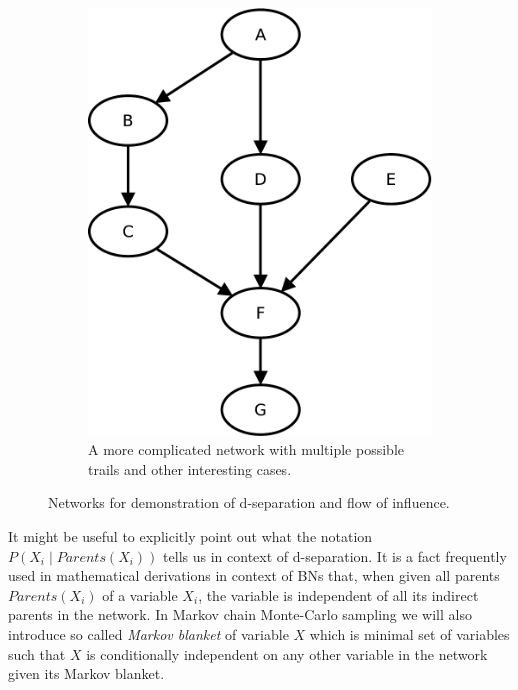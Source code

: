 \documentclass[english,cover]{fitthesis} %
\newcommand{\term}[1]{\emph{#1}}           %
\begin{document}
\begin{center}
\begin{figure}[h]
    \begin{subfigure}[b]{0.42\linewidth}
        \vspace{0.5cm}
        \includegraphics[scale=0.4]{fig/bn-d_sep-abstract}
        \caption{A more complicated network with multiple possible trails and other interesting cases.}
        \label{fig:bn_d-separation_abstract}
    \end{subfigure}
    
    \caption{Networks for demonstration of d-separation and flow of influence.}
    \label{fig:bn_d-separation}
\end{figure}
\end{center}

It might be useful to explicitly point out what the notation $P(X_i \mid Parents(X_i))$ tells us in context of d-separation. It is a fact frequently used in mathematical derivations in context of BNs that, when given all parents $Parents(X_i)$ of a variable $X_i$, the variable is independent of all its indirect parents in the network. In Markov chain Monte-Carlo sampling we will also introduce so called \term{Markov blanket} of variable $X$ which is minimal set of variables such that $X$ is conditionally independent on any other variable in the network given its Markov blanket.
\end{document}
